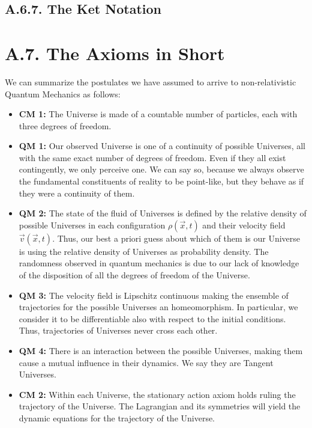 \documentclass[11pt, a4paper]{article} %
\begin{document}
\subsection*{A.6.7. The Ket Notation}


\newpage
{}
\section*{A.7. The Axioms in Short}
We can summarize the postulates we have assumed to arrive to non-relativistic Quantum Mechanics as follows:
\begin{itemize}
\item {\bf CM 1:} The Universe is made of a countable number of particles, each with three degrees of freedom.

\item {\bf QM 1:} Our observed Universe is one of a continuity of possible Universes, all with the same exact number of degrees of freedom. Even if they all exist contingently, we only perceive one. We can say so, because we always observe the fundamental constituents of reality to be point-like, but they behave as if they were a continuity of them.

\item {\bf QM 2:} The state of the fluid of Universes is defined by the relative density of possible Universes in each configuration $\rho(\vec{x},t)$ and their velocity field $\vec{v}(\vec{x},t)$. Thus, our best a priori guess about which of them is our Universe is using the relative density of Universes as probability density. The randomness observed in quantum mechanics is due to our lack of knowledge of the disposition of all the degrees of freedom of the Universe.

\item {\bf QM 3:} The velocity field is Lipschitz continuous making the ensemble of trajectories for the possible Universes an homeomorphism. In particular, we consider it to be differentiable also with respect to the initial conditions. Thus, trajectories of Universes never cross each other.

\item {\bf QM 4:} There is an interaction between the possible Universes, making them cause a mutual influence in their dynamics. We say they are Tangent Universes.

\item {\bf CM 2:} Within each Universe, the stationary action axiom holds ruling the trajectory of the Universe. The Lagrangian and its symmetries will yield the dynamic equations for the trajectory of the Universe.


\end{itemize}
\end{document}
